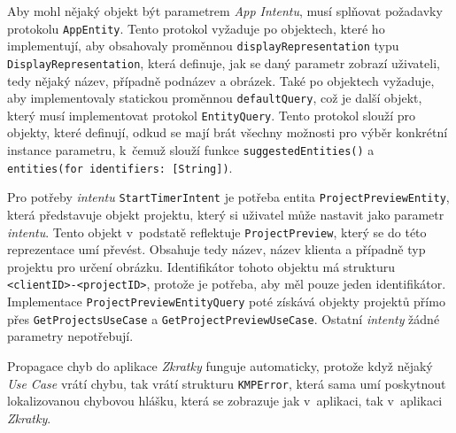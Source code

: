 Aby mohl nějaký objekt být parametrem \emph{App Intentu}, musí splňovat požadavky protokolu \texttt{AppEntity}. Tento protokol vyžaduje po objektech, které ho implementují, aby obsahovaly proměnnou \texttt{displayRepresentation} typu \texttt{DisplayRepresentation}, která definuje, jak se daný parametr zobrazí uživateli, tedy nějaký název, případně podnázev a obrázek. Také po objektech vyžaduje, aby implementovaly statickou proměnnou \texttt{defaultQuery}, což je další objekt, který musí implementovat protokol \texttt{EntityQuery}. Tento protokol slouží pro objekty, které definují, odkud se mají brát všechny možnosti pro výběr konkrétní instance parametru, k~čemuž slouží funkce \texttt{suggestedEntities()} a \texttt{entities(for identifiers: [String])}.

Pro potřeby \emph{intentu} \texttt{StartTimerIntent} je potřeba entita \texttt{ProjectPreviewEntity}, která představuje objekt projektu, který si uživatel může nastavit jako parametr \emph{intentu}. Tento objekt v~podstatě reflektuje \texttt{ProjectPreview}, který se do této reprezentace umí převést. Obsahuje tedy název, název klienta a případně typ projektu pro určení obrázku. Identifikátor tohoto objektu má strukturu \texttt{<clientID>-<projectID>}, protože je potřeba, aby měl pouze jeden identifikátor. Implementace \texttt{ProjectPreviewEntityQuery} poté získává objekty projektů přímo přes \texttt{GetProjectsUseCase} a \texttt{GetProjectPreviewUseCase}. Ostatní \emph{intenty} žádné parametry nepotřebují.

Propagace chyb do aplikace \emph{Zkratky} funguje automaticky, protože když nějaký \emph{Use Case} vrátí chybu, tak vrátí strukturu \texttt{KMPError}, která sama umí poskytnout lokalizovanou chybovou hlášku, která se zobrazuje jak v~aplikaci, tak v~aplikaci \emph{Zkratky}.
































